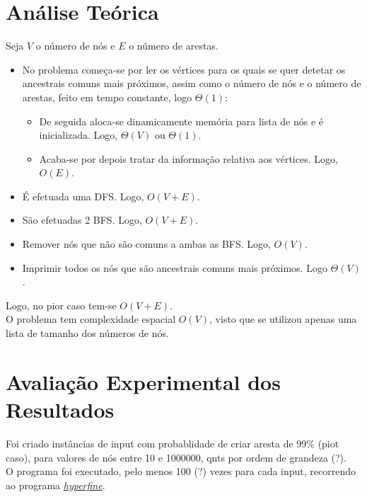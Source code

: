 \documentclass[12pt,a4paper]{article}
\begin{document}
  \section{Análise Teórica}

  Seja $V$ o número de nós e $E$ o número de arestas.

  \begin{itemize}
    \setlength{\itemsep}{0pt}
    \item No problema começa-se por ler os vértices para os quais se quer detetar os ancestrais comuns mais próximos, assim como o número de nós e o número de arestas, feito em tempo constante, logo $\Theta(1)$:
    \begin{itemize}
      \setlength{\itemsep}{0pt}
      \item De seguida aloca-se dinamicamente memória para lista de nós e é inicializada. Logo, $\Theta(V)$ ou $\Theta(1)$.
      \item Acaba-se por depois tratar da informação relativa aos vértices. Logo, $O(E)$.
    \end{itemize}

   \item É efetuada uma DFS. Logo, $O(V + E)$.

  \item São efetuadas 2 BFS. Logo, $O(V + E)$.

  \item Remover nós que não são comuns a ambas as BFS. Logo, $O(V)$.

  \item Imprimir todos os nós que são ancestrais comuns mais próximos. Logo $\Theta(V)$.
  \end{itemize}
  Logo, no pior caso tem-se $O(V + E)$.\\
  O problema tem complexidade espacial $O(V)$, visto que se utilizou apenas uma lista de tamanho dos números de nós.

  \section{Avaliação Experimental dos Resultados}

  Foi criado instâncias de input com probablidade de criar aresta de 99\% (piot caso), para valores de nós entre 10 e 1000000, qnts por ordem de grandeza (?).\\
  O programa foi executado, pelo menos 100 (?) vezes para cada input, recorrendo ao programa \href{https://github.com/sharkdp/hyperfine}{\textit{hyperfine}}.
    
\end{document}
